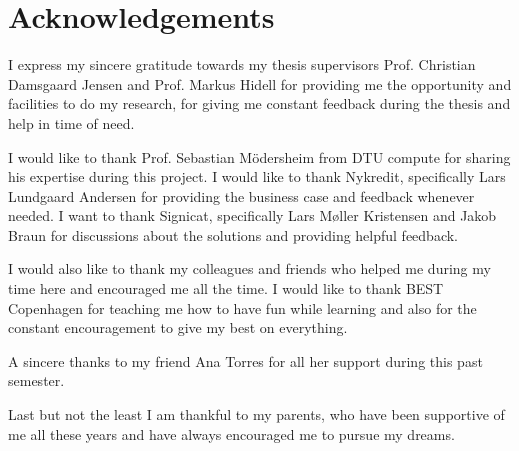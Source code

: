 \chapter{Acknowledgements}

I express my sincere gratitude towards my thesis supervisors Prof. Christian Damsgaard Jensen and Prof. Markus Hidell for providing me the opportunity and facilities to do my research, for giving me constant feedback during the thesis and help in time of need.

I would like to thank Prof. Sebastian Mödersheim from DTU compute for sharing his expertise during this project. I would like to thank Nykredit, specifically Lars Lundgaard Andersen for providing the business case and feedback whenever needed. I want to thank Signicat, specifically Lars Møller Kristensen and Jakob Braun for discussions about the solutions and providing helpful feedback.

I would also like to thank my colleagues and friends who helped me during my time here and encouraged me all the time. I would like to thank BEST Copenhagen for teaching me how to have fun while learning and also for the constant encouragement to give my best on everything.

A sincere thanks to my friend Ana Torres for all her support during this past semester.

Last but not the least I am thankful to my parents, who have been supportive of me all these years and have always encouraged me to pursue my dreams.